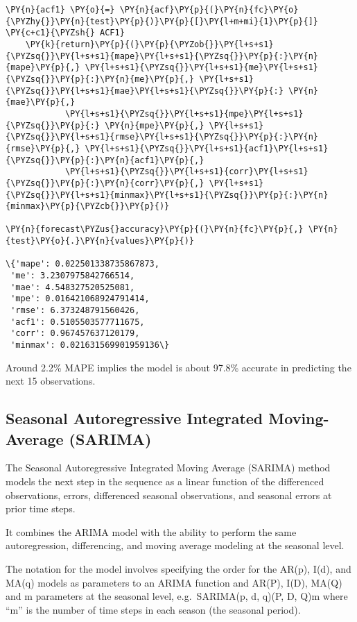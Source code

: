 \begin{tcolorbox}[breakable, size=fbox, boxrule=1pt, pad at break*=1mm,colback=cellbackground, colframe=cellborder]
\begin{Verbatim}[commandchars=\\\{\}]
    \PY{n}{acf1} \PY{o}{=} \PY{n}{acf}\PY{p}{(}\PY{n}{fc}\PY{o}{\PYZhy{}}\PY{n}{test}\PY{p}{)}\PY{p}{[}\PY{l+m+mi}{1}\PY{p}{]}                      \PY{c+c1}{\PYZsh{} ACF1}
    \PY{k}{return}\PY{p}{(}\PY{p}{\PYZob{}}\PY{l+s+s1}{\PYZsq{}}\PY{l+s+s1}{mape}\PY{l+s+s1}{\PYZsq{}}\PY{p}{:}\PY{n}{mape}\PY{p}{,} \PY{l+s+s1}{\PYZsq{}}\PY{l+s+s1}{me}\PY{l+s+s1}{\PYZsq{}}\PY{p}{:}\PY{n}{me}\PY{p}{,} \PY{l+s+s1}{\PYZsq{}}\PY{l+s+s1}{mae}\PY{l+s+s1}{\PYZsq{}}\PY{p}{:} \PY{n}{mae}\PY{p}{,} 
            \PY{l+s+s1}{\PYZsq{}}\PY{l+s+s1}{mpe}\PY{l+s+s1}{\PYZsq{}}\PY{p}{:} \PY{n}{mpe}\PY{p}{,} \PY{l+s+s1}{\PYZsq{}}\PY{l+s+s1}{rmse}\PY{l+s+s1}{\PYZsq{}}\PY{p}{:}\PY{n}{rmse}\PY{p}{,} \PY{l+s+s1}{\PYZsq{}}\PY{l+s+s1}{acf1}\PY{l+s+s1}{\PYZsq{}}\PY{p}{:}\PY{n}{acf1}\PY{p}{,} 
            \PY{l+s+s1}{\PYZsq{}}\PY{l+s+s1}{corr}\PY{l+s+s1}{\PYZsq{}}\PY{p}{:}\PY{n}{corr}\PY{p}{,} \PY{l+s+s1}{\PYZsq{}}\PY{l+s+s1}{minmax}\PY{l+s+s1}{\PYZsq{}}\PY{p}{:}\PY{n}{minmax}\PY{p}{\PYZcb{}}\PY{p}{)}

\PY{n}{forecast\PYZus{}accuracy}\PY{p}{(}\PY{n}{fc}\PY{p}{,} \PY{n}{test}\PY{o}{.}\PY{n}{values}\PY{p}{)}

\{'mape': 0.022501338735867873,
 'me': 3.2307975842766514,
 'mae': 4.548327520525081,
 'mpe': 0.016421068924791414,
 'rmse': 6.373248791560426,
 'acf1': 0.5105503577711675,
 'corr': 0.967457637120179,
 'minmax': 0.021631569901959136\}
\end{Verbatim}
\end{tcolorbox}
        
Around 2.2\% MAPE implies the model is about 97.8\% accurate in
predicting the next 15 observations.

\subsection{Seasonal Autoregressive Integrated Moving-Average
(SARIMA)}\label{seasonal-autoregressive-integrated-moving-average-sarima}

The Seasonal Autoregressive Integrated Moving Average (SARIMA) method
models the next step in the sequence as a linear function of the
differenced observations, errors, differenced seasonal observations, and
seasonal errors at prior time steps.

It combines the ARIMA model with the ability to perform the same
autoregression, differencing, and moving average modeling at the
seasonal level.

The notation for the model involves specifying the order for the AR(p),
I(d), and MA(q) models as parameters to an ARIMA function and AR(P),
I(D), MA(Q) and m parameters at the seasonal level, e.g.~SARIMA(p, d,
q)(P, D, Q)m where ``m'' is the number of time steps in each season (the
seasonal period). 

